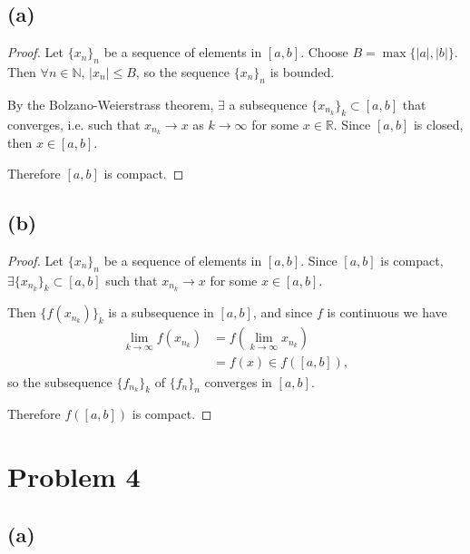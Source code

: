 \documentclass{article}
\newcommand{\R}{\mathbb{R}} %
\newcommand{\N}{\mathbb{N}} %
\begin{document}
\subsection*{(a)}
\begin{proof}
	Let $\{x_n\}_n$ be a sequence of elements in $[a, b]$. Choose $B = \max\{|a|, |b|\}$. Then $\forall n \in \N$, $|x_n| \leq B$, so the sequence $\{x_n\}_n$ is bounded.
	
	By the Bolzano-Weierstrass theorem, $\exists$ a subsequence $\{x_{n_k}\}_k \subset [a, b]$ that converges, i.e. such that $x_{n_k} \to x$ as $k \to \infty$ for some $x \in \R$. Since $[a, b]$ is closed, then $x \in [a, b]$.
	
	Therefore $[a, b]$ is compact.
\end{proof}

\subsection*{(b)}
\begin{proof}
	Let $\{x_n\}_n$ be a sequence of elements in $[a, b]$. Since $[a, b]$ is compact, $\exists \{x_{n_k}\}_k \subset [a, b]$ such that $x_{n_k} \to x$ for some $x \in [a, b]$. 
	
	Then $\{f(x_{n_k})\}_k$ is a subsequence in $[a, b]$, and since $f$ is continuous we have
	\begin{align}
		\lim\limits_{k \to \infty}f\left(x_{n_k}\right) &= f\left(\lim\limits_{k \to \infty} x_{n_k}\right) \\
		&= f(x) \in f \left([a, b]\right),
	\end{align}
	so the subsequence $\{f_{n_k}\}_k$ of $\{f_n\}_n$ converges in $[a, b]$. 
	
	Therefore $f\left([a, b]\right)$ is compact.
\end{proof}
\section*{Problem 4}
\subsection*{(a)}
\end{document}
